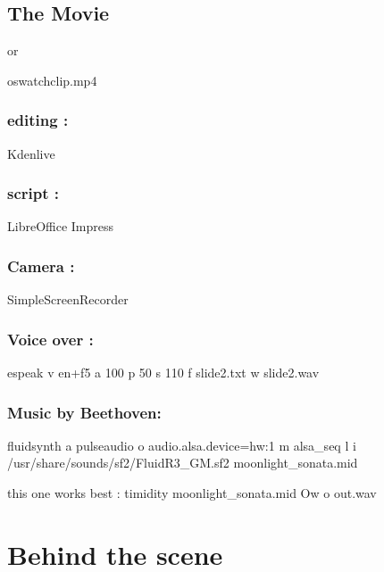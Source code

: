 \documentclass[letterpaper,10pt,english]{sphinxmanual}
\begin{document}
\section{The Movie}
\label{\detokenize{hacking/movie:the-movie}}\label{\detokenize{hacking/movie::doc}}

or

oswatchclip.mp4


\subsection{editing :}
\label{\detokenize{hacking/movie:editing}}
Kdenlive


\subsection{script :}
\label{\detokenize{hacking/movie:script}}
LibreOffice Impress


\subsection{Camera :}
\label{\detokenize{hacking/movie:camera}}
SimpleScreenRecorder


\subsection{Voice over :}
\label{\detokenize{hacking/movie:voice-over}}
espeak \sphinxhyphen{}v en+f5 \sphinxhyphen{}a 100 \sphinxhyphen{}p 50 \sphinxhyphen{}s 110 \sphinxhyphen{}f slide2.txt \sphinxhyphen{}w slide2.wav


\subsection{Music by Beethoven:}
\label{\detokenize{hacking/movie:music-by-beethoven}}
fluidsynth \sphinxhyphen{}a pulseaudio \sphinxhyphen{}o audio.alsa.device=hw:1 \sphinxhyphen{}m alsa\_seq \sphinxhyphen{}l \sphinxhyphen{}i /usr/share/sounds/sf2/FluidR3\_GM.sf2 moonlight\_sonata.mid

this one works best :
timidity moonlight\_sonata.mid \sphinxhyphen{}Ow \sphinxhyphen{}o out.wav


\chapter{Behind the scene}
\label{\detokenize{behind/behind:behind-the-scene}}\label{\detokenize{behind/behind:id1}}\label{\detokenize{behind/behind::doc}}
\end{document}
